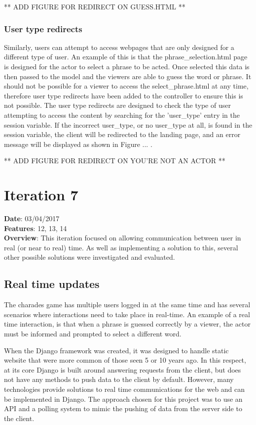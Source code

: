 ** ADD FIGURE FOR REDIRECT ON GUESS.HTML ** 

\subsubsection{User type redirects}
Similarly, users can attempt to access webpages that are only designed for a different type of user. An example of this is that the phrase\_selection.html page is designed for the actor to select a phrase to be acted. Once selected this data is then passed to the model and the viewers are able to guess the word or phrase. It should not be possible for a viewer to access the select\_phrase.html at any time, therefore user type redirects have been added to the controller to ensure this is not possible. The user type redirects are designed to check the type of user attempting to access the content by searching for the 'user\_type' entry in the session variable. If the incorrect user\_type, or no user\_type at all, is found in the session variable, the client will be redirected to the landing page, and an error message will be displayed as shown in Figure ... .

** ADD FIGURE FOR REDIRECT ON YOU'RE NOT AN ACTOR **

\newpage

\section{Iteration 7}
\textbf{Date}: 03/04/2017 \\
\textbf{Features}: 12, 13, 14 \\
\textbf{Overview}: This iteration focused on allowing communication between user in real (or near to real) time. As well as implementing a solution to this, several other possible solutions were investigated and evaluated. 

\subsection{Real time updates}
The charades game has multiple users logged in at the same time and has several scenarios where interactions need to take place in real-time. An example of a real time interaction, is that when a phrase is guessed correctly by a viewer, the actor must be informed and prompted to select a different word.

When the Django framework was created, it was designed to handle static website that were more common of those seen 5 or 10 years ago. In this respect, at its core Django is built around answering requests from the client, but does not have any methods to push data to the client by default. However, many technologies provide solutions to real time communications for the web and can be implemented in Django. The approach chosen for this project was to use an API and a polling system to mimic the pushing of data from the server side to the client. 

